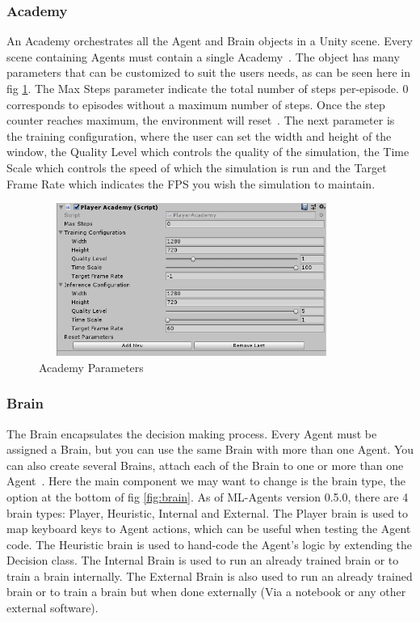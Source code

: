 \subsubsection{Academy}
An Academy orchestrates all the Agent and Brain objects in a Unity scene. Every scene containing Agents must contain a single Academy~\cite{mlagentAcademy}. The object has many parameters that can be customized to suit the users needs, as can be seen here in fig \ref{fig:academy}. The Max Steps parameter indicate the total number of steps per-episode. 0 corresponds to episodes without a maximum number of steps. Once the step counter reaches maximum, the environment will reset~\cite{mlagentAcademy}. The next parameter is the training configuration, where the user can set the width and height of the window, the Quality Level which controls the quality of the simulation, the Time Scale which controls the speed of which the simulation is run and the Target Frame Rate which indicates the FPS you wish the simulation to maintain.

\begin{figure}[H]
    \centering
    \includegraphics[width=100mm, height=50mm]{img/Academy.PNG}
    \caption{Academy Parameters}
    \label{fig:academy}
\end{figure}

\subsubsection{Brain}
The Brain encapsulates the decision making process. Every Agent must be assigned a Brain, but you can use the same Brain with more than one Agent. You can also create several Brains, attach each of the Brain to one or more than one Agent~\cite{mlagentBrain}. Here the main component we may want to change is the brain type, the option at the bottom of fig \ref{fig:brain}. As of ML-Agents version 0.5.0, there are 4 brain types: Player, Heuristic, Internal and External.
The Player brain is used to map keyboard keys to Agent actions, which can be useful when testing the Agent code.
The Heuristic brain is used to hand-code the Agent's logic by extending the Decision class. The Internal Brain is used to run an already trained brain or to train a brain internally. The External Brain is also used to run an already trained brain or to train a brain but when done externally (Via a notebook or any other external software).

